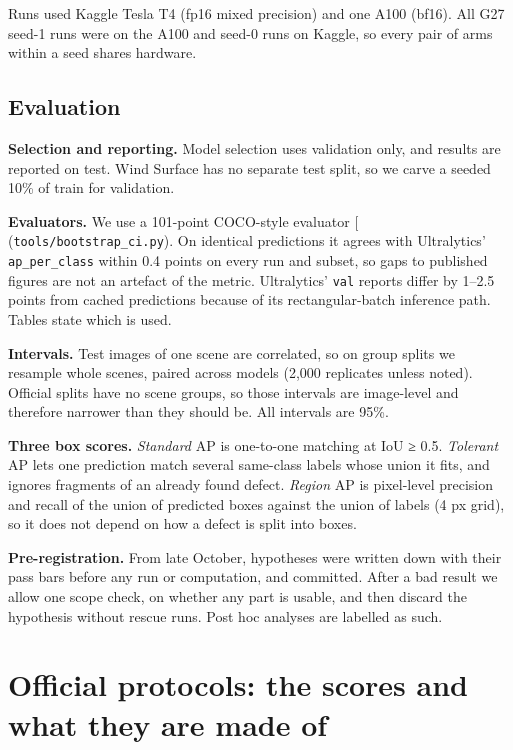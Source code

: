 \documentclass[
  10pt,
]{article}
\begin{document}
Runs used Kaggle Tesla T4 (fp16 mixed precision) and one A100 (bf16).
All G27 seed-1 runs were on the A100 and seed-0 runs on Kaggle, so every
pair of arms within a seed shares hardware.

\subsection{Evaluation}\label{evaluation}

\textbf{Selection and reporting.} Model selection uses validation only,
and results are reported on test. Wind Surface has no separate test
split, so we carve a seeded 10\% of train for validation.

\textbf{Evaluators.} We use a 101-point COCO-style evaluator
{[}\citeproc{ref-coco}{39}{]} (\texttt{tools/bootstrap\_ci.py}). On
identical predictions it agrees with Ultralytics'
\texttt{ap\_per\_class} within 0.4 points on every run and subset, so
gaps to published figures are not an artefact of the metric.
Ultralytics' \texttt{val} reports differ by 1--2.5 points from cached
predictions because of its rectangular-batch inference path. Tables
state which is used.

\textbf{Intervals.} Test images of one scene are correlated, so on group
splits we resample whole scenes, paired across models (2,000 replicates
unless noted). Official splits have no scene groups, so those intervals
are image-level and therefore narrower than they should be. All
intervals are 95\%.

\textbf{Three box scores.} \emph{Standard} AP is one-to-one matching at
IoU ≥ 0.5. \emph{Tolerant} AP lets one prediction match several
same-class labels whose union it fits, and ignores fragments of an
already found defect. \emph{Region} AP is pixel-level precision and
recall of the union of predicted boxes against the union of labels (4 px
grid), so it does not depend on how a defect is split into boxes.

\textbf{Pre-registration.} From late October, hypotheses were written
down with their pass bars before any run or computation, and committed.
After a bad result we allow one scope check, on whether any part is
usable, and then discard the hypothesis without rescue runs. Post hoc
analyses are labelled as such.

\section{Official protocols: the scores and what they are made
of}\label{sec:official}
\end{document}
